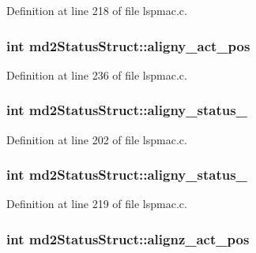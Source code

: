 Definition at line 218 of file lspmac.c.\hypertarget{structmd2StatusStruct_a0d40a01d2aa93c443526e826440f77fc}{
\subsubsection[{aligny\_\-act\_\-pos}]{\setlength{\rightskip}{0pt plus 5cm}int {\bf md2StatusStruct::aligny\_\-act\_\-pos}}}
\label{structmd2StatusStruct_a0d40a01d2aa93c443526e826440f77fc}


Definition at line 236 of file lspmac.c.\hypertarget{structmd2StatusStruct_a2f2a11fe2fc7a446323def2be465185a}{
\subsubsection[{aligny\_\-status\_\-1}]{\setlength{\rightskip}{0pt plus 5cm}int {\bf md2StatusStruct::aligny\_\-status\_}}}
\label{structmd2StatusStruct_a2f2a11fe2fc7a446323def2be465185a}


Definition at line 202 of file lspmac.c.\hypertarget{structmd2StatusStruct_a1f98d8b9831e32d77129f9b0f1d7d255}{
\subsubsection[{aligny\_\-status\_\-2}]{\setlength{\rightskip}{0pt plus 5cm}int {\bf md2StatusStruct::aligny\_\-status\_}}}
\label{structmd2StatusStruct_a1f98d8b9831e32d77129f9b0f1d7d255}


Definition at line 219 of file lspmac.c.\hypertarget{structmd2StatusStruct_a480f892fe91b05b2980fb00064807e2b}{
\subsubsection[{alignz\_\-act\_\-pos}]{\setlength{\rightskip}{0pt plus 5cm}int {\bf md2StatusStruct::alignz\_\-act\_\-pos}}}
\label{structmd2StatusStruct_a480f892fe91b05b2980fb00064807e2b}


